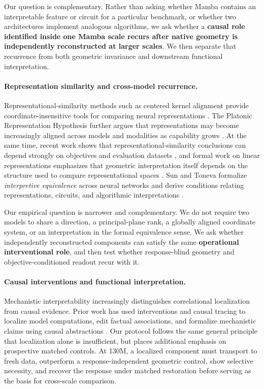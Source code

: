 \documentclass{article}
\begin{document}
Our question is complementary. Rather than asking whether Mamba contains an interpretable feature or circuit for a particular benchmark, or whether two architectures implement analogous algorithms, we ask whether a \textbf{causal role identified inside one Mamba scale recurs after native geometry is independently reconstructed at larger scales}. We then separate that recurrence from both geometric invariance and downstream functional interpretation.

\paragraph{Representation similarity and cross-model recurrence.}

Representational-similarity methods such as centered kernel alignment provide coordinate-insensitive tools for comparing neural representations \citep{kornblith2019cka}. The Platonic Representation Hypothesis further argues that representations may become increasingly aligned across models and modalities as capability grows \citep{huh2024platonic}. At the same time, recent work shows that representational-similarity conclusions can depend strongly on objectives and evaluation datasets \citep{ciernik2025objective}, and formal work on linear representations emphasizes that geometric interpretation itself depends on the structure used to compare representational spaces \citep{park2024linear}. Sun and Toneva formalize \emph{interpretive equivalence} across neural networks and derive conditions relating representations, circuits, and algorithmic interpretations \citep{sun2026equivalent}.

Our empirical question is narrower and complementary. We do not require two models to share a direction, a principal-plane rank, a globally aligned coordinate system, or an interpretation in the formal equivalence sense. We ask whether independently reconstructed components can satisfy the same \textbf{operational interventional role}, and then test whether response-blind geometry and objective-conditioned readout recur with it.

\paragraph{Causal interventions and functional interpretation.}

Mechanistic interpretability increasingly distinguishes correlational localization from causal evidence. Prior work has used interventions and causal tracing to localize model computations, edit factual associations, and formalize mechanistic claims using causal abstractions \citep{dai2022knowledge,meng2022rome,geiger2023causal}. Our protocol follows the same general principle that localization alone is insufficient, but places additional emphasis on prospective matched controls. At 130M, a localized component must transport to fresh data, outperform a response-independent geometric control, show selective necessity, and recover the response under matched restoration before serving as the basis for cross-scale comparison.
\end{document}
